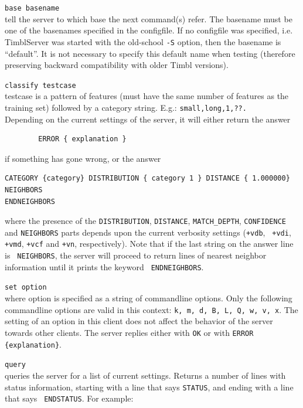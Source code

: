 \documentclass{report}
\begin{document}
\begin{description}
\item {\tt base basename}\\
  tell the server to which base the next command(s) refer. The
  basename must be one of the basenames specified in the configfile.
  If no configfile was specified, i.e. TimblServer was
  started with the old-school {\tt -S} option, then the basename is
  ``default''. It is not necessary to specify this default name when
  testing (therefore preserving backward compatibility with older
  Timbl versions).

\item {\tt classify testcase}\\
  testcase is a pattern of features (must have the same number of
  features as the training set) followed by a category
  string. E.g.: {\tt small,long,1,??.}\\
  Depending on the current settings of the server, it will either
  return the answer
      \begin{verbatim}
        ERROR { explanation }
      \end{verbatim}
      if something has gone wrong, or the answer
      \begin{verbatim}
CATEGORY {category} DISTRIBUTION { category 1 } DISTANCE { 1.000000} NEIGHBORS
ENDNEIGHBORS
      \end{verbatim}
      where the presence of the {\tt DISTRIBUTION}, {\tt DISTANCE},
      {\tt MATCH\_DEPTH}, {\tt CONFIDENCE} and {\tt NEIGHBORS} parts
      depends upon the current verbosity settings ({\tt +vdb}, {\tt
        +vdi}, {\tt +vmd}, {\tt +vcf} and {\tt +vn}, respectively).
      Note that if the last string on the answer line is {\tt
        NEIGHBORS}, the server will proceed to return lines of nearest
      neighbor information until it prints the keyword {\tt
        ENDNEIGHBORS}.
\item {\tt set option}\\ where option is specified as a string of
      commandline options. Only the following commandline
      options are valid in this context: {\tt k, m, d, B, L, Q, w, v,
      x}. The setting of an option in this client does not affect the
      behavior of the server towards other clients. The server replies
      either with {\tt OK} or with {\tt ERROR \{explanation\}}.
    \item {\tt query}\\
      queries the server for a list of current settings. Returns a
      number of lines with status information, starting with a line
      that says {\tt STATUS}, and ending with a line that says {\tt
        ENDSTATUS}. For example:


\end{description}
\end{document}
